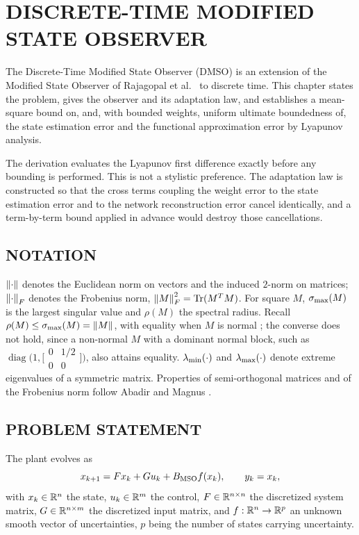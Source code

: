 \chapter{DISCRETE-TIME MODIFIED STATE OBSERVER}
\label{ch:dmso}

The Discrete-Time Modified State Observer (DMSO) is an extension of the Modified
State Observer of Rajagopal et al.\ \cite{rajagopal2009mso} to discrete time.
This chapter states the problem, gives the observer and its adaptation law, and
establishes a mean-square bound on, and, with bounded weights, uniform
ultimate boundedness of, the state estimation error and the functional
approximation error by Lyapunov analysis.

The derivation evaluates the Lyapunov first difference exactly before any
bounding is performed. This is not a stylistic preference. The adaptation law is
constructed so that the cross terms coupling the weight error to the state
estimation error and to the network reconstruction error cancel identically, and
a term-by-term bound applied in advance would destroy those cancellations.

\section{NOTATION}

$\left\lVert \cdot \right\rVert$ denotes the Euclidean norm on vectors and the induced $2$-norm on
matrices; $\left\lVert \cdot \right\rVert_F$ denotes the Frobenius norm, $\left\lVert M \right\rVert_F^2=\operatorname{Tr}(M^TM)$.
For square $M$, $\sigma_{\max}(M)$ is the largest singular value and $\rho(M)$ the
spectral radius. Recall $\rho(M)\le\sigma_{\max}(M)=\left\lVert M \right\rVert$, with equality when
$M$ is normal \cite{horn2013matrix}; the converse does not hold, since a
non-normal $M$ with a dominant normal block, such as
$\operatorname{diag}\bigl(1,\bigl[\begin{smallmatrix}0&1/2\\0&0\end{smallmatrix}\bigr]\bigr)$,
also attains equality. $\lambda_{\min}(\cdot)$ and $\lambda_{\max}(\cdot)$ denote
extreme eigenvalues of a symmetric matrix. Properties of semi-orthogonal
matrices and of the Frobenius norm follow Abadir and Magnus
\cite{abadir2005matrix}.

\section{PROBLEM STATEMENT}
\label{sec:problem}

\begin{assumption}[Plant]\label{as:plant}
The plant evolves as
\begin{equation}\label{eq:plant}
x_{k+1}=Fx_k+Gu_k+B_{\mathrm{MSO}} f(x_k),\qquad y_k=x_k,
\end{equation}
with $x_k\in\mathbb{R}^n$ the state, $u_k\in\mathbb{R}^m$ the control, $F\in\mathbb{R}^{n\times n}$ the
discretized system matrix, $G\in\mathbb{R}^{n\times m}$ the discretized input matrix,
and $f:\mathbb{R}^n\to\mathbb{R}^p$ an unknown smooth vector of uncertainties, $p$ being the
number of states carrying uncertainty.
\end{assumption}


